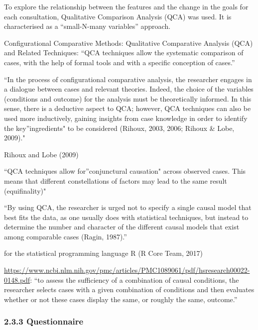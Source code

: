 \documentclass[
  english,
  man]{apa7}
\begin{document}
To explore the relationship between the features and the change in the goals for each consultation, Qualitative Comparison Analysis (QCA) was used. It is characterised as a ``small-N-many variables'' approach.

Configurational Comparative Methods: Qualitative Comparative Analysis (QCA) and Related Techniques: ``QCA techniques allow the systematic comparison of cases, with the help of formal tools and with a specific conception of cases.''

``In the process of configurational comparative analysis, the researcher engages in a dialogue between cases and relevant theories. Indeed, the choice of the variables (conditions and outcome) for the analysis must be theoretically informed. In this sense, there is a deductive aspect to QCA; however, QCA techniques can also be used more inductively, gaining insights from case knowledge in order to identify the key''ingredients" to be considered (Rihoux, 2003, 2006; Rihoux \& Lobe, 2009)."

Rihoux and Lobe (2009)

``QCA techniques allow for''conjunctural causation" across observed cases. This means that different constellations of factors may lead to the same result (equifinality)"

``By using QCA, the researcher is urged not to specify a single causal model that best fits the data, as one usually does with statistical techniques, but instead to determine the number and character of the different causal models that exist among comparable cases (Ragin, 1987).''

for the statistical programming language R (R Core Team, 2017)

\url{https://www.ncbi.nlm.nih.gov/pmc/articles/PMC1089061/pdf/hsresearch00022-0148.pdf}: ``to assess the sufficiency of a combination of causal conditions, the researcher selects cases with a given combination of conditions and then evaluates whether or not these cases display the same, or roughly the same, outcome.''

\hypertarget{questionnaire}{%
\subsubsection{2.3.3 Questionnaire}\label{questionnaire}}
\end{document}

